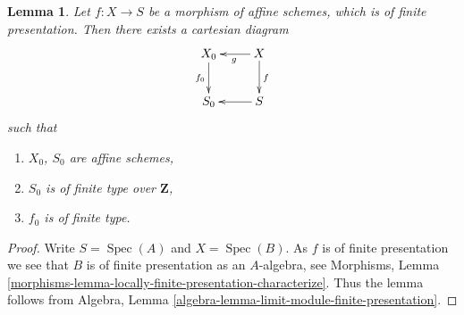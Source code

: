 \documentclass[10pt,a4paper]{amsart}
\theoremstyle{plain}
\newtheorem{lemma}[subsection]{Lemma}
\theoremstyle{definition}
\theoremstyle{remark}
\numberwithin{equation}{subsection}
\def\Spec{\mathop{\mathrm{Spec}}}
\begin{document}
\begin{lemma}
\label{lemma-Noetherian-approximation}
Let $f : X \to S$ be a morphism of affine schemes, which is of finite
presentation. Then there exists a cartesian diagram
$$
\xymatrix{
X_0 \ar[d]_{f_0} & X \ar[l]^g \ar[d]^f \\
S_0 & S \ar[l]
}
$$
such that
\begin{enumerate}
\item $X_0$, $S_0$ are affine schemes,
\item $S_0$ is of finite type over $\mathbf{Z}$,
\item $f_0$ is of finite type.
\end{enumerate}
\end{lemma}

\begin{proof}
Write $S = \Spec(A)$ and $X = \Spec(B)$.
As $f$ is of finite presentation we see that
$B$ is of finite presentation as an $A$-algebra, see
Morphisms,
Lemma \ref{morphisms-lemma-locally-finite-presentation-characterize}.
Thus the lemma follows from
Algebra, Lemma \ref{algebra-lemma-limit-module-finite-presentation}.
\end{proof}
\end{document}
